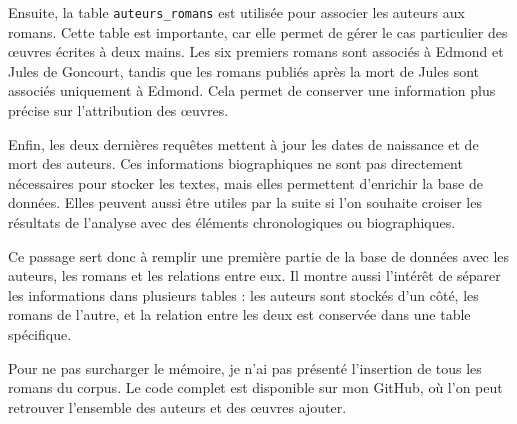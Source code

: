 Ensuite, la table \texttt{auteurs\_romans} est utilisée pour associer les auteurs aux romans. Cette table est importante, car elle permet de gérer le cas particulier des œuvres écrites à deux mains. Les six premiers romans sont associés à Edmond et Jules de Goncourt, tandis que les romans publiés après la mort de Jules sont associés uniquement à Edmond. Cela permet de conserver une information plus précise sur l'attribution des œuvres.

Enfin, les deux dernières requêtes mettent à jour les dates de naissance et de mort des auteurs. Ces informations biographiques ne sont pas directement nécessaires pour stocker les textes, mais elles permettent d'enrichir la base de données. Elles peuvent aussi être utiles par la suite si l'on souhaite croiser les résultats de l'analyse avec des éléments chronologiques ou biographiques.

Ce passage sert donc à remplir une première partie de la base de données avec les auteurs, les romans et les relations entre eux. Il montre aussi l'intérêt de séparer les informations dans plusieurs tables : les auteurs sont stockés d'un côté, les romans de l'autre, et la relation entre les deux est conservée dans une table spécifique.

Pour ne pas surcharger le mémoire, je n'ai pas présenté l'insertion de tous les romans du corpus. Le code complet est disponible sur mon GitHub, où l'on peut retrouver l'ensemble des auteurs et des œuvres ajouter.